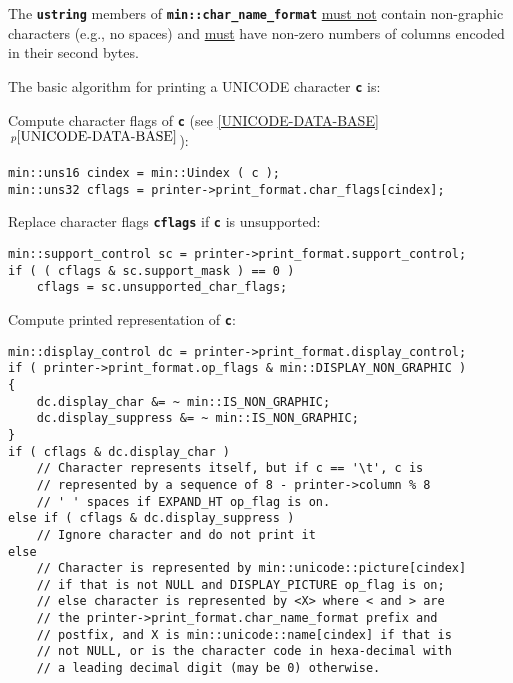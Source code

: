 \documentclass[12pt]{article}
\newcommand{\TT}[1]{{\tt \bfseries #1}}
\newcommand{\itemref}[1]{\ref{#1}$\,^{p\pageref{#1}}$}
\newenvironment{indpar}[1][0.3in]%
	{\begin{list}{}%
		     {\setlength{\itemsep}{0in}%
		      \setlength{\topsep}{0in}%
		      \setlength{\parsep}{1ex}%
		      \setlength{\labelwidth}{#1}%
		      \setlength{\leftmargin}{#1}%
		      \addtolength{\leftmargin}{\labelsep}}%
	 \item}%
	{\end{list}}
\begin{document}
The \TT{ustring} members of \TT{min::char\_name\_format} \underline{must not}
contain non-graphic characters (e.g., no spaces) and \underline{must}
have non-zero numbers of columns encoded in their second bytes.

The basic algorithm for printing a UNICODE character \TT{c} is:

\begin{enumerate}

\item Compute character flags of \TT{c} (see \itemref{UNICODE-DATA-BASE}):%
\label{COMPUTE-CHARACTER-FLAGS}
\begin{indpar}\begin{verbatim}
min::uns16 cindex = min::Uindex ( c );
min::uns32 cflags = printer->print_format.char_flags[cindex];
\end{verbatim}\end{indpar}

\item Replace character flags \TT{cflags} if \TT{c} is unsupported:%
\label{REPLACE-CHARACTER-FLAGS}
\begin{indpar}\begin{verbatim}
min::support_control sc = printer->print_format.support_control;
if ( ( cflags & sc.support_mask ) == 0 )
    cflags = sc.unsupported_char_flags;
\end{verbatim}\end{indpar}

\item Compute printed representation of \TT{c}:%
\label{COMPUTE-PRINTED-REPRESENTATION}
\begin{indpar}\begin{verbatim}
min::display_control dc = printer->print_format.display_control;
if ( printer->print_format.op_flags & min::DISPLAY_NON_GRAPHIC )
{
    dc.display_char &= ~ min::IS_NON_GRAPHIC;
    dc.display_suppress &= ~ min::IS_NON_GRAPHIC;
}
if ( cflags & dc.display_char )
    // Character represents itself, but if c == '\t', c is
    // represented by a sequence of 8 - printer->column % 8
    // ' ' spaces if EXPAND_HT op_flag is on.
else if ( cflags & dc.display_suppress )
    // Ignore character and do not print it
else
    // Character is represented by min::unicode::picture[cindex]
    // if that is not NULL and DISPLAY_PICTURE op_flag is on;
    // else character is represented by <X> where < and > are
    // the printer->print_format.char_name_format prefix and
    // postfix, and X is min::unicode::name[cindex] if that is
    // not NULL, or is the character code in hexa-decimal with
    // a leading decimal digit (may be 0) otherwise.
\end{verbatim}\end{indpar}


\end{enumerate}
\end{document}
